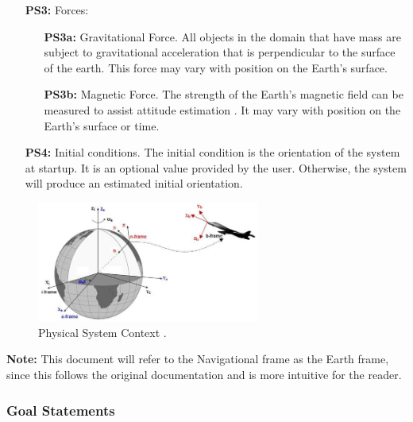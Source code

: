 \documentclass[12pt]{article}
\begin{document}
\begin{itemize}
  \item[\textbf{PS3:}] Forces:
  \begin{itemize}
    \item[\textbf{PS3a:}] Gravitational Force. All objects in the domain that have mass are subject
    to gravitational acceleration that is perpendicular to the surface of the earth. This force may
    vary with position on the Earth's surface.
    \item[\textbf{PS3b:}] Magnetic Force. The strength of the Earth's magnetic field can be measured
    to assist attitude estimation \cite{magnet}. It may vary with position on the Earth's surface or
    time.
  \end{itemize}
  \item[\textbf{PS4:}] Initial conditions. The initial condition is the orientation of the system at
  startup. It is an optional value provided by the user. Otherwise, the system will produce an
  estimated initial orientation.
\end{itemize}

\begin{figure}[h!]
    \centerline{\includegraphics[width=0.65\textwidth, trim={0 0 0
    0},clip]{Reference-coordinates-frames-in-inertial-navigation-systems.png}} \caption{Physical
    System Context \cite{ins}.}
    \label{fig:ref_diag} 
\end{figure}

\textbf{Note:} This document will refer to the Navigational frame as the Earth frame, since this
follows the original documentation \cite{madgwick_ecient_nodate} and is more intuitive for the
reader.


\subsubsection{Goal Statements}

\end{document}
